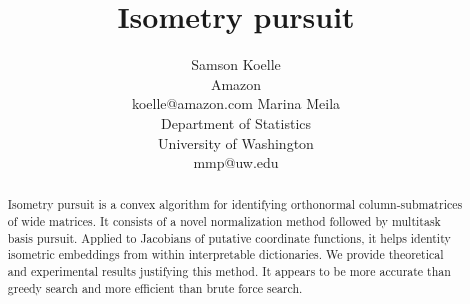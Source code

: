 \documentclass{article}
\title{Isometry pursuit}
\author{%
  Samson Koelle \\
  Amazon  \\
  koelle@amazon.com
  \And
  Marina Meila \\
  Department of Statistics\\
  University of Washington \\
  mmp@uw.edu
}
\begin{document}
\maketitle

\begin{abstract}
Isometry pursuit is a convex algorithm for identifying orthonormal column-submatrices of wide matrices.
It consists of a novel normalization method followed by multitask basis pursuit.
Applied to Jacobians of putative coordinate functions, it helps identity isometric embeddings from within interpretable dictionaries.
We provide theoretical and experimental results justifying this method.
It appears to be more accurate than greedy search and more efficient than brute force search.
\end{abstract}












\end{document}
